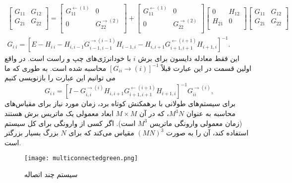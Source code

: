 \begin{equation}
\begin{split}
	    \left[ \begin{matrix}
           {{G}_{11}} & {{G}_{12}}  \\
           {{G}_{21}} & {{G}_{22}}  \\
        \end{matrix} \right]=\left[ \begin{matrix}
           G_{11}^{\leftarrow (1)} & 0  \\
           0 & G_{22}^{\to (2)}  \\
        \end{matrix} \right]+\left[ \begin{matrix}
           G_{11}^{\leftarrow (1)} & 0  \\
           0 & G_{22}^{\to (2)}  \\
        \end{matrix} \right]\left[ \begin{matrix}
           0 & {{H}_{12}}  \\
           {{H}_{21}} & 0  \\
        \end{matrix} \right]\left[ \begin{matrix}
           {{G}_{11}} & {{G}_{12}}  \\
           {{G}_{21}} & {{G}_{22}}  \\
        \end{matrix} \right]\\
        G_{i\ i}^{{}}={{\left[ E-{{H}_{i\ i}}-{{H}_{i,i-1}}G_{i-1,i-1}^{\to (i-1)}{{H}_{i-1,i}}-{{H}_{i,i+1}}G_{i+1,i+1}^{\leftarrow (i+1)}{{H}_{i+1,i}} \right]}^{-1}}.
\end{split}
\end{equation}
این فقط معادله دایسون برای برش $i$ با خودانرژی‌های چپ و راست است. در واقع اولین قسمت در این عبارت قبلاً $[G_{ii}\rightarrow(i)]^{-1}$ محاسبه شده است. به طوری که ما می توانیم این عبارت را بازنویسی کنیم
\begin{equation}
    G_{i\ i}^{{}}={{\left[ I-G_{i,i}^{\to (i)}{{H}_{i,i+1}}G_{i+1,i+1}^{\leftarrow (i+1)}{{H}_{i+1,i}} \right]}^{-1}}G_{ii}^{\to (i)},
\end{equation}
برای سیستم‌های طولانی با برهمکنش کوتاه برد، زمان مورد نیاز برای مقیاس‌های محاسبه به عنوان $M^3N$، که در آن $M\times M$ ابعاد معمولی یک ماتریس برش هستند (زمان معمولی وارونگی ماتریس $M^3$ است). اگر کسی از وارونگی برای کل سیستم استفاده کند، آن را به صورت $(MN)^3$ مقیاس می‌کند که برای $N$ بزرگ بسیار بزرگتر است.
\begin{figure*}
    \centering
    \texttt{[image: multiconnectedgreen.png]}
    \caption{سیستم چند اتصاله}
    \label{fig:multiconnectedgreen}
\end{figure*}
